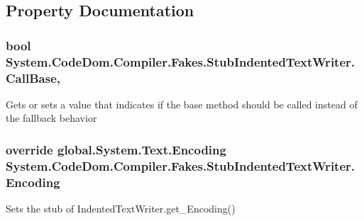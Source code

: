 \subsection{Property Documentation}
\hypertarget{class_system_1_1_code_dom_1_1_compiler_1_1_fakes_1_1_stub_indented_text_writer_a80256ca9d86ed4f8b85bde55bd28cf11}{
\subsubsection[{Call\-Base}]{\setlength{\rightskip}{0pt plus 5cm}bool System.\-Code\-Dom.\-Compiler.\-Fakes.\-Stub\-Indented\-Text\-Writer.\-Call\-Base\hspace{0.3cm}{\ttfamily [get]}, {\ttfamily [set]}}}\label{class_system_1_1_code_dom_1_1_compiler_1_1_fakes_1_1_stub_indented_text_writer_a80256ca9d86ed4f8b85bde55bd28cf11}


Gets or sets a value that indicates if the base method should be called instead of the fallback behavior

\hypertarget{class_system_1_1_code_dom_1_1_compiler_1_1_fakes_1_1_stub_indented_text_writer_a71eb838137d6d134c19bc76f77fbdcf8}{
\subsubsection[{Encoding}]{\setlength{\rightskip}{0pt plus 5cm}override global.\-System.\-Text.\-Encoding System.\-Code\-Dom.\-Compiler.\-Fakes.\-Stub\-Indented\-Text\-Writer.\-Encoding\hspace{0.3cm}{\ttfamily [get]}}}\label{class_system_1_1_code_dom_1_1_compiler_1_1_fakes_1_1_stub_indented_text_writer_a71eb838137d6d134c19bc76f77fbdcf8}


Sets the stub of Indented\-Text\-Writer.\-get\-\_\-\-Encoding()


